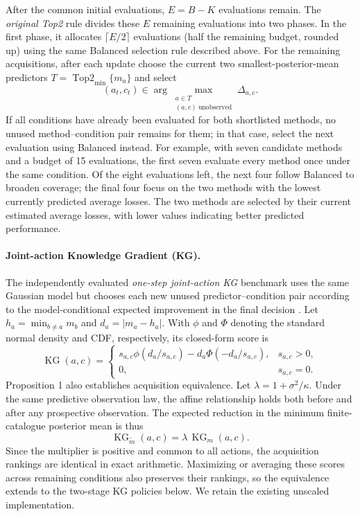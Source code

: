 \documentclass[10pt,a4paper]{article}
\newif\ifrevisionmarked
\newcommand{\revadd}[1]{\ifrevisionmarked\hl{#1}\else#1\fi}
\newcommand{\revaddmath}[1]{\ifrevisionmarked\colorbox{yellow}{$#1$}\else#1\fi}
\begin{document}
After the common initial evaluations, $E=B-K$ evaluations remain. The \emph{original Top2} rule divides these $E$ remaining evaluations into two phases. In the first phase, it allocates $\lceil E/2\rceil$ evaluations (half the remaining budget, rounded up) using the same Balanced selection rule described above. For the remaining acquisitions, after each update choose the current two smallest-posterior-mean predictors $T=\operatorname{Top2}_{\min}\{m_a\}$ and select
\begin{equation}
 (a_t,c_t)\in\arg\max_{\substack{a\in T\\(a,c)\ \mathrm{unobserved}}}\Delta_{a,c}.
 \label{eq:top2}
\end{equation}
If all conditions have already been evaluated for both shortlisted methods, no unused method--condition pair remains for them; in that case, select the next evaluation using Balanced instead. For example, with seven candidate methods and a budget of 15 evaluations, the first seven evaluate every method once under the same condition. Of the eight evaluations left, the next four follow Balanced to broaden coverage; the final four focus on the two methods with the lowest currently predicted average losses. The two methods are selected by their current estimated average losses, with lower values indicating better predicted performance.

\paragraph{Joint-action Knowledge Gradient (KG).}
The independently evaluated \emph{one-step joint-action KG} benchmark uses the same Gaussian model but chooses each new unused predictor--condition pair according to the model-conditional expected improvement in the final decision \cite{frazier2008}. Let $h_a=\min_{b\ne a}m_b$ and $d_a=|m_a-h_a|$. With $\phi$ and $\Phi$ denoting the standard normal density and CDF, respectively, its closed-form score is
\begin{equation}
 \operatorname{KG}(a,c)=
 \begin{cases}
 s_{a,c}\phi(d_a/s_{a,c})-d_a\Phi(-d_a/s_{a,c}),&s_{a,c}>0,\\
 0,&s_{a,c}=0.
 \end{cases}
 \label{eq:kg}
\end{equation}
\revadd{Proposition 1 also establishes acquisition equivalence. Let} $\revaddmath{\lambda=1+\sigma^2/\kappa}$. \revadd{Under the same predictive observation law, the affine relationship holds both before and after any prospective observation. The expected reduction in the minimum finite-catalogue posterior mean is thus}
\[
\revaddmath{\displaystyle \operatorname{KG}_{\widetilde m}(a,c)
=\lambda\,\operatorname{KG}_{m}(a,c).}
\]
\revadd{Since the multiplier is positive and common to all actions, the acquisition rankings are identical in exact arithmetic. Maximizing or averaging these scores across remaining conditions also preserves their rankings, so the equivalence extends to the two-stage KG policies below. We retain the existing unscaled implementation.}
\end{document}
